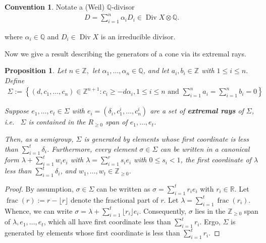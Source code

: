 \documentclass{amsart}
\theoremstyle{plain}
\newtheorem{prop}[thm]{Proposition}
\theoremstyle{definition}
\newtheorem{convention}[thm]{Convention}
\theoremstyle{remark}
\numberwithin{equation}{section}
\newcommand\br{{\mathbb R}}
\newcommand\bq{{\mathbb Q}}
\newcommand\bz{{\mathbb Z}}
\DeclareMathOperator\di{Div}
\newcommand\pdeg{\delta}
\DeclareMathOperator{\fr}{frac}
\begin{document}
\begin{convention}
Notate a (Weil) $\bq$-divisor
\begin{align*}
	D = \sum_{i=1}^{n}\alpha_i D_i \in \di X \otimes \bq.
\end{align*}

\noindent
where $\alpha_i \in \bq$ and $D_i \in \di X$ is an irreducible divisor.
\end{convention}

Now we give a result describing the generators of a cone via its
extremal rays.

\begin{prop}
\label{prop:cone-generation}
Let $n \in \bz,$ let $\alpha_1, \ldots, \alpha_n \in \bq$, and let
$a_i, b_i \in \bz$ with $1 \leq i \leq n.$ Define
\begin{align*}
	\Sigma := \left \{(d, c_1, \ldots, c_n) \in \bz^{n + 1} : c_i \geq -
	d \alpha_i, 1 \leq i \leq n \text{ and } \sum_{i = 1}^{n} a_i =
	\sum_{i	= 1}^{n}b_i = 0 \right \}
\end{align*}

\noindent
Suppose $e_1, \ldots, e_t \in \Sigma$ with $e_i = (\pdeg_i, c_1^i,
\ldots, c_n^i)$ are a set of {\bf extremal rays} of $\Sigma$,
i.e.~ $\Sigma$ is contained in the $R_{\geq 0}$ span of
$e_1, \ldots, e_t$.

Then, as a semigroup, $\Sigma$ is generated by
elements whose first coordinate is less than $\sum_{i = 1}^{t}
\pdeg_i$. Furthermore, every element $\sigma \in \Sigma$ can be
written in a canonical form $\lambda + \sum_{i = 1}^{t} w_i e_i$ 
with $\lambda = \sum_{i = 1}^{r} s_i e_i$ with $0 \leq s_i < 1$, the
first coordinate of $\lambda$ less than $\sum_{i=1}^{t}\pdeg_i$,
and $w_1, \ldots, w_t \in \bz_{\geq 0}$.
\end{prop}

\begin{proof}
By assumption, $\sigma \in \Sigma$ can be written as $\sigma = \sum_
{i = 1}^{t} r_i e_i$ with $r_i \in \br$. Let $\fr(r) := r - \lfloor r
\rfloor$ denote the fractional part of $r$. Let $\lambda = \sum_{i = 1}
^{t} \fr(r_i)$. Whence, we can write $\sigma = \lambda + \sum_{i = 1}
^{t} \lfloor r_i \rfloor e_i.$ Consequently, $\sigma$ lies in the
$\bz_{\geq 0}$ span of $\lambda, e_1, \ldots, e_t$, which all have
first coordinate less than $\sum_{i=1}^{t} r_i$. Ergo, $\Sigma$ is
generated by elements whose first coordinate is less than
$\sum_{i = 1}^{t} r_i$.
\end{proof}
\end{document}
